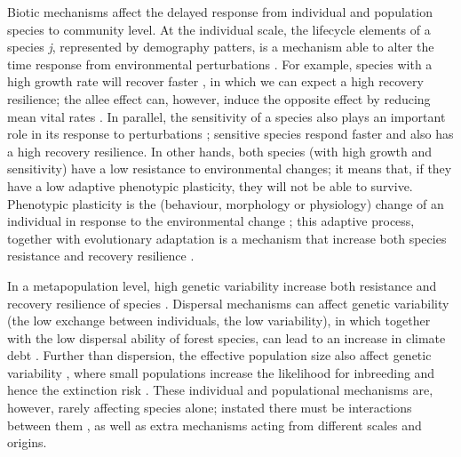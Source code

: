 Biotic mechanisms affect the delayed response from individual and population species to community level.
At the individual scale, the lifecycle elements of a species \textit{j}, represented by demography patters, is a mechanism able to alter the time response from environmental perturbations \parencite{Bertrand2016}.
For example, species with a high growth rate will recover faster \parencite{Grman2010}, in which we can expect a high recovery resilience; the allee effect can, however, induce the opposite effect by reducing mean vital rates \parencite{Dennis2002}.
In parallel, the sensitivity of a species also plays an important role in its response to perturbations \parencite{Oliver2015,Bertrand2016}; sensitive species respond faster and also has a high recovery resilience.
In other hands, both species (with high growth and sensitivity) have a low resistance to environmental changes; it means that, if they have a low adaptive phenotypic plasticity, they will not be able to survive.
Phenotypic plasticity is the (behaviour, morphology or physiology) change of an individual in response to the environmental change \parencite{Price2003}; this adaptive process, together with evolutionary adaptation \parencite{Bertrand2016} is a mechanism that increase both species resistance and recovery resilience \parencite{Essl2015,Oliver2015}.

In a metapopulation level, high genetic variability increase both resistance and recovery resilience of species \parencite{Hylander2013,Oliver2015}.
Dispersal mechanisms can affect genetic variability (the low exchange between individuals, the low variability), in which together with the low dispersal ability of forest species, can lead to an increase in climate debt \parencite{Hylander2013,Bertrand2016}.
Further than dispersion, the effective population size also affect genetic variability \parencite{Oliver2015}, where small populations increase the likelihood for inbreeding and hence the extinction risk \parencite{Nieminen2001}.
These individual and populational mechanisms are, however, rarely affecting species alone; instated there must be interactions between them \parencite{Hylander2013}, as well as extra mechanisms acting from different scales and origins.


